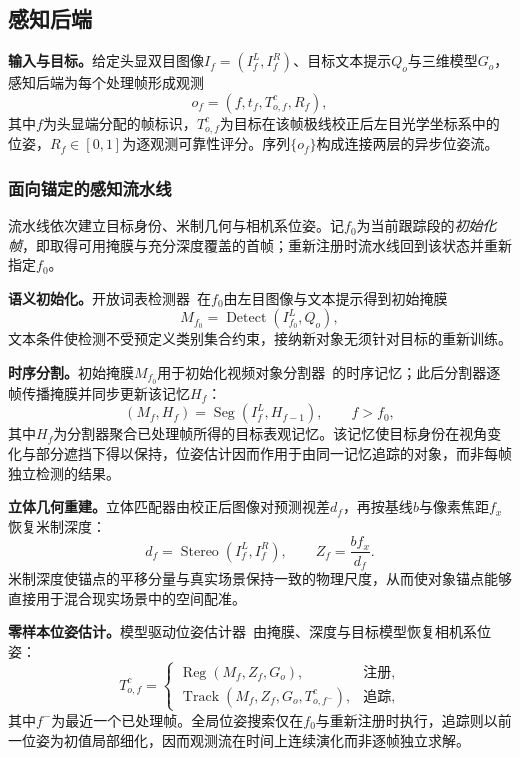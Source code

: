 \documentclass[review]{vgtc}
\begin{document}
\subsection{感知后端}\label{sec:perception}

\textbf{输入与目标。}给定头显双目图像$I_f = (I_f^L, I_f^R)$、目标文本提示$Q_o$与三维模型$G_o$，感知后端为每个处理帧形成观测
\begin{equation}
o_f = (f, t_f, T_{o,f}^{c}, R_f),
\label{eq:observation}
\end{equation}
其中$f$为头显端分配的帧标识，$T_{o,f}^{c}$为目标在该帧极线校正后左目光学坐标系中的位姿，$R_f \in [0,1]$为逐观测可靠性评分。序列$\{o_f\}$构成连接两层的异步位姿流。

\subsubsection{面向锚定的感知流水线}

流水线依次建立目标身份、米制几何与相机系位姿。记$f_0$为当前跟踪段的\emph{初始化帧}，即取得可用掩膜与充分深度覆盖的首帧；重新注册时流水线回到该状态并重新指定$f_0$。

\textbf{语义初始化。}开放词表检测器~\cite{yoloe2025}在$f_0$由左目图像与文本提示得到初始掩膜
\begin{equation}
M_{f_0} = \operatorname{Detect}(I_{f_0}^{L}, Q_o),
\label{eq:detect}
\end{equation}
文本条件使检测不受预定义类别集合约束，接纳新对象无须针对目标的重新训练。

\textbf{时序分割。}初始掩膜$M_{f_0}$用于初始化视频对象分割器~\cite{cutie2024}的时序记忆；此后分割器逐帧传播掩膜并同步更新该记忆$H_f$：
\begin{equation}
(M_f, H_f) = \operatorname{Seg}(I_f^{L}, H_{f-1}), \qquad f > f_0,
\label{eq:seg}
\end{equation}
其中$H_f$为分割器聚合已处理帧所得的目标表观记忆。该记忆使目标身份在视角变化与部分遮挡下得以保持，位姿估计因而作用于由同一记忆追踪的对象，而非每帧独立检测的结果。

\textbf{立体几何重建。}立体匹配器由校正后图像对预测视差$d_f$，再按基线$b$与像素焦距$f_x$恢复米制深度：
\begin{equation}
d_f = \operatorname{Stereo}(I_f^{L}, I_f^{R}), \qquad Z_f = \frac{b f_x}{d_f}.
\label{eq:depth}
\end{equation}
米制深度使锚点的平移分量与真实场景保持一致的物理尺度，从而使对象锚点能够直接用于混合现实场景中的空间配准。

\textbf{零样本位姿估计。}模型驱动位姿估计器~\cite{foundationpose2023}由掩膜、深度与目标模型恢复相机系位姿：
\begin{equation}
T_{o,f}^{c} =
\begin{cases}
\operatorname{Reg}(M_f, Z_f, G_o), & \text{注册}, \\
\operatorname{Track}(M_f, Z_f, G_o, T_{o,f^-}^{c}), & \text{追踪},
\end{cases}
\label{eq:pose}
\end{equation}
其中$f^-$为最近一个已处理帧。全局位姿搜索仅在$f_0$与重新注册时执行，追踪则以前一位姿为初值局部细化，因而观测流在时间上连续演化而非逐帧独立求解。
\end{document}
